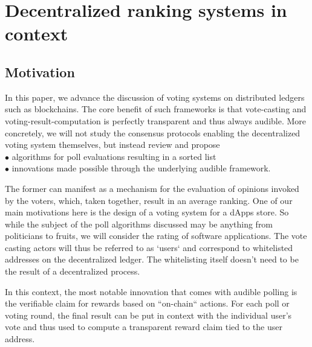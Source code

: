 
\section{Decentralized ranking systems in context}
\subsection{Motivation} 
In this paper, we advance the discussion of voting systems on distributed ledgers such as blockchains. The core benefit of such frameworks is  that vote-casting and voting-result-computation is perfectly transparent and thus always audible.
More concretely, we will not study the consensus protocols enabling the decentralized voting system themselves, but instead review and propose\\
$\bullet$ algorithms for poll evaluations resulting in a sorted list\\
$\bullet$ innovations made possible through the underlying audible framework.

The former can manifest as a mechanism for the evaluation of opinions invoked by the voters, which, taken together, result in an average ranking. One of our main motivations here is the design of a voting system for a dApps store. So while the subject of the poll algorithms discussed may be anything from politicians to fruits, we will consider the rating of software applications. The vote casting actors will thus be referred to as `users` and correspond to whitelisted addresses on the decentralized ledger. The whitelisting itself doesn't need to be the result of a decentralized process. 

In this context, the most notable innovation that comes with audible polling is the verifiable claim for rewards based on ``on-chain`` actions. For each poll or voting round, the final result can be put in context with the individual user's vote and thus used to compute a transparent reward claim tied to the user address.
